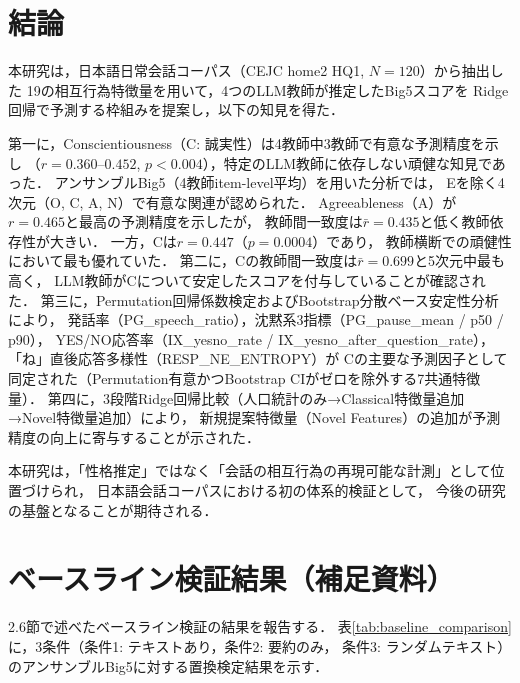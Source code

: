 \documentclass[dvipdfmx,11pt,a4paper]{bxjsarticle}
\begin{document}
\section{結論}

本研究は，日本語日常会話コーパス（CEJC home2 HQ1, $N = 120$）から抽出した
19の相互行為特徴量を用いて，4つのLLM教師が推定したBig5スコアを
Ridge回帰で予測する枠組みを提案し，以下の知見を得た．

第一に，Conscientiousness（C: 誠実性）は4教師中3教師で有意な予測精度を示し
（$r = 0.360$--$0.452$, $p < 0.004$），特定のLLM教師に依存しない頑健な知見であった．
アンサンブルBig5（4教師item-level平均）を用いた分析では，
Eを除く4次元（O, C, A, N）で有意な関連が認められた．
Agreeableness（A）が$r = 0.465$と最高の予測精度を示したが，
教師間一致度は$\bar{r} = 0.435$と低く教師依存性が大きい．
一方，Cは$r = 0.447$（$p = 0.0004$）であり，
教師横断での頑健性において最も優れていた．
第二に，Cの教師間一致度は$\bar{r} = 0.699$と5次元中最も高く，
LLM教師がCについて安定したスコアを付与していることが確認された．
第三に，Permutation回帰係数検定およびBootstrap分散ベース安定性分析により，
発話率（PG\_speech\_ratio），沈黙系3指標（PG\_pause\_mean / p50 / p90），
YES/NO応答率（IX\_yesno\_rate / IX\_yesno\_after\_question\_rate），
「ね」直後応答多様性（RESP\_NE\_ENTROPY）が
Cの主要な予測因子として同定された（Permutation有意かつBootstrap CIがゼロを除外する7共通特徴量）．
第四に，3段階Ridge回帰比較（人口統計のみ→Classical特徴量追加→Novel特徴量追加）により，
新規提案特徴量（Novel Features）の追加が予測精度の向上に寄与することが示された．

本研究は，「性格推定」ではなく「会話の相互行為の再現可能な計測」として位置づけられ，
日本語会話コーパスにおける初の体系的検証として，
今後の研究の基盤となることが期待される．

\appendix

\section{ベースライン検証結果（補足資料）}
\label{sec:result_baseline}

2.6節で述べたベースライン検証の結果を報告する．
表\ref{tab:baseline_comparison}に，3条件（条件1: テキストあり，条件2: 要約のみ，
条件3: ランダムテキスト）のアンサンブルBig5に対する置換検定結果を示す．
\end{document}
